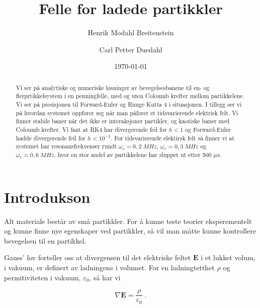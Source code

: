 \documentclass[reprint,english,notitlepage, nofootinbib]{revtex4-1}  %
\begin{document}
\title{Felle for ladede partikkler}   %
\author{Henrik Modahl Breitenstein}               %
\author{Carl Petter Duedahl}
\date{\today}                             %
\noaffiliation                            %
\begin{abstract}                          %
	
Vi ser på analytiske og numeriske løsninger av bevegelsesbanene til en- og flerprtikkelsystem i en penningfelle, med og uten Coloumb krefter mellom partikkelene. Vi ser på presisjonen til Forward-Euler og Runge Kutta 4 i situasjonen. I tillegg ser vi på hvordan systemet oppfører seg når man påfører et tidsvarierende elektrisk felt. Vi finner stabile baner når det ikke er interaksjoner partikler, og kaotiske baner med Coloumb krefter. Vi fant at RK4 har divergerende feil for $h < 1$ og Forward-Euler hadde divergerende feil for $h < 10^{-3}$. For tidsvarierende elektirsk felt så finner vi at systemet har resonansfrekvenser rundt $\omega_v = 0,2 \; MHz$, $\omega_v = 0,3 \; MHz$ og $\omega_v = 0,6 \; MHz$, hvor en stor andel av partikkelene har sluppet ut etter 500 $\mu s$.
	
\end{abstract}                            %
\maketitle                                %


\section{Introdukson}

Alt materiale består av små partikkler. For å kunne teste teorier eksperementelt og kunne finne nye egenskaper ved partikkler, så vil man måtte kunne kontrollere bevegelsen til en partikkel. 

Gauss' lov forteller oss at divergensen til det elektriske feltet $\mathbf{E}$ i et lukket volum, i vakuum, er definert av ladningene i volumet. For en ladningtetthet $\rho$ og permitiviteten i vakuum, $\varepsilon_0$, så har vi

\begin{equation}
\label{gauss}
\nabla{\mathbf{E}} = \frac{\rho}{\varepsilon_0} \; .
\end{equation} 
\end{document}
